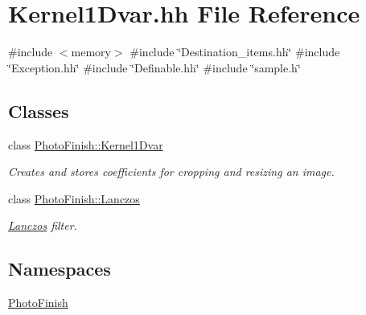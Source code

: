 \hypertarget{_kernel1_dvar_8hh}{}\section{Kernel1\+Dvar.\+hh File Reference}
\label{_kernel1_dvar_8hh}
{\ttfamily \#include $<$memory$>$}\newline
{\ttfamily \#include \char`\"{}Destination\+\_\+items.\+hh\char`\"{}}\newline
{\ttfamily \#include \char`\"{}Exception.\+hh\char`\"{}}\newline
{\ttfamily \#include \char`\"{}Definable.\+hh\char`\"{}}\newline
{\ttfamily \#include \char`\"{}sample.\+h\char`\"{}}\newline
\subsection*{Classes}
\begin{DoxyCompactItemize}
\item 
class \hyperlink{class_photo_finish_1_1_kernel1_dvar}{Photo\+Finish\+::\+Kernel1\+Dvar}
\begin{DoxyCompactList}\small\item\em Creates and stores coefficients for cropping and resizing an image. \end{DoxyCompactList}\item 
class \hyperlink{class_photo_finish_1_1_lanczos}{Photo\+Finish\+::\+Lanczos}
\begin{DoxyCompactList}\small\item\em \hyperlink{class_photo_finish_1_1_lanczos}{Lanczos} filter. \end{DoxyCompactList}\end{DoxyCompactItemize}
\subsection*{Namespaces}
\begin{DoxyCompactItemize}
\item 
 \hyperlink{namespace_photo_finish}{Photo\+Finish}
\end{DoxyCompactItemize}
